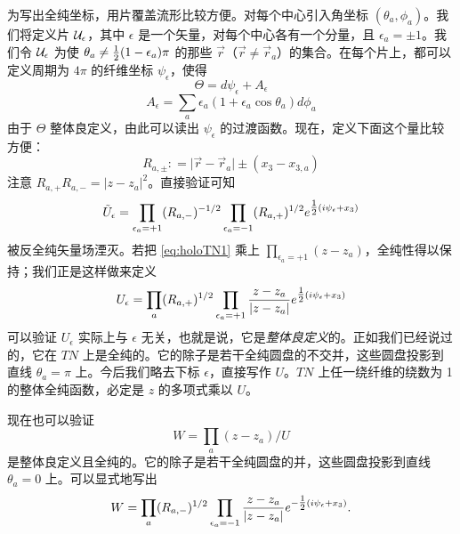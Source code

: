 为写出全纯坐标，用片覆盖流形比较方便。对每个中心引入角坐标 $(\theta_a, \phi_a)$。我们将定义片 $\mathcal{U}_\epsilon$，其中 $\epsilon$ 是一个矢量，对每个中心各有一个分量，且 $\epsilon_a = \pm 1$。我们令 $\mathcal{U}_\epsilon$ 为使 $\theta_a \not= \tfrac{1}{2}(1-\epsilon_a)\pi$ 的那些 $\vec r$（$\vec r\not=\vec r_a$）的集合。在每个片上，都可以定义周期为 $4\pi$ 的纤维坐标 $\psi_\epsilon$，使得
\begin{equation}
\Theta = d \psi_\epsilon + A_\epsilon
\end{equation}
\begin{equation}
A_\epsilon = \sum_a \epsilon_a (1 + \epsilon_a\cos\theta_a) d \phi_a
\end{equation}
由于 $\Theta$ 整体良定义，由此可以读出 $\psi_\epsilon$ 的过渡函数。现在，定义下面这个量比较方便：
\begin{equation}
R_{a,\pm}: = \vert \vec r - \vec r_a\vert \pm (x_3 - x_{3,a} )
\end{equation}
注意 $R_{a,+}R_{a,-} = \vert z-z_a\vert^2$。直接验证可知
\begin{equation}\label{eq:holoTN1}
\tilde U_\epsilon = \prod_{\epsilon_a=+1} (R_{a,-})^{-1/2}
\prod_{\epsilon_a = -1} (R_{a,+})^{1/2} e^{\tfrac{1}{2} (i \psi_\epsilon + x_3)}
\end{equation}
被反全纯矢量场湮灭。若把 \eqref{eq:holoTN1} 乘上 $\prod_{\epsilon_a=+1}(z-z_a)$，全纯性得以保持；我们正是这样做来定义
\begin{equation}
U_\epsilon = \prod_a (R_{a,+})^{1/2} \prod_{\epsilon_a=+1}
\frac{z-z_a}{\vert z-z_a\vert} e^{\tfrac{1}{2} (i \psi_\epsilon + x_3)}
\end{equation}
可以验证 $U_\epsilon$ 实际上与 $\epsilon$ 无关，也就是说，它是\emph{整体良定义}的。正如我们已经说过的，它在 $TN$ 上是全纯的。它的除子是若干全纯圆盘的不交并，这些圆盘投影到直线 $\theta_a = \pi$ 上。今后我们略去下标 $\epsilon$，直接写作 $U$。$TN$ 上任一绕纤维的绕数为 1 的整体全纯函数，必定是 $z$ 的多项式乘以 $U$。

现在也可以验证
\begin{equation}
W = \prod_a (z-z_a)/U
\end{equation}
是整体良定义且全纯的。它的除子是若干全纯圆盘的并，这些圆盘投影到直线 $\theta_a = 0$ 上。可以显式地写出
\begin{equation}
W = \prod_a (R_{a,-})^{1/2} \prod_{\epsilon_a=-1}\frac{ z-z_a}{\vert z-z_a\vert} e^{-\tfrac{1}{2} ( i \psi_\epsilon + x_3)}.
\end{equation}

